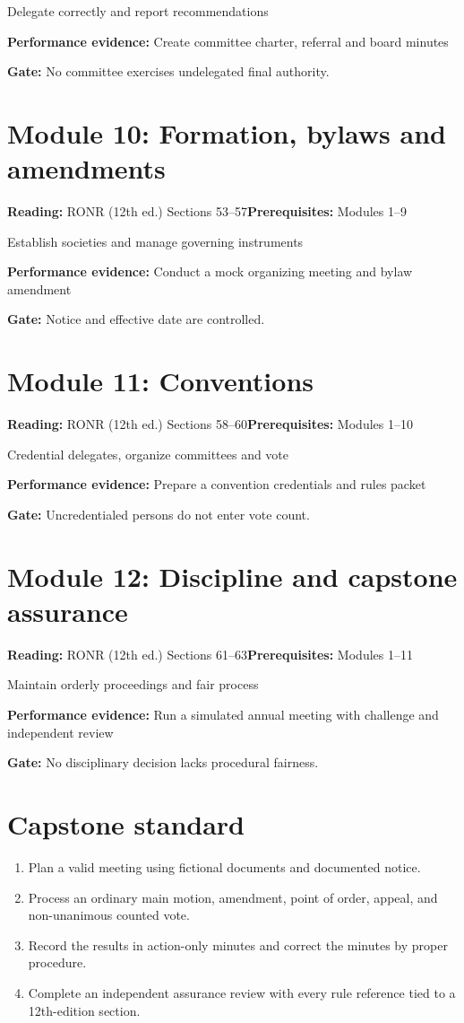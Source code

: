\documentclass[11pt]{article}
\begin{document}
Delegate correctly and report recommendations

\textbf{Performance evidence:} Create committee charter, referral and board minutes

\textbf{Gate:} No committee exercises undelegated final authority.

\section{Module 10: Formation, bylaws and amendments}
\textbf{Reading:} RONR (12th ed.) Sections 53--57\quad\textbf{Prerequisites:} Modules 1--9

Establish societies and manage governing instruments

\textbf{Performance evidence:} Conduct a mock organizing meeting and bylaw amendment

\textbf{Gate:} Notice and effective date are controlled.

\section{Module 11: Conventions}
\textbf{Reading:} RONR (12th ed.) Sections 58--60\quad\textbf{Prerequisites:} Modules 1--10

Credential delegates, organize committees and vote

\textbf{Performance evidence:} Prepare a convention credentials and rules packet

\textbf{Gate:} Uncredentialed persons do not enter vote count.

\section{Module 12: Discipline and capstone assurance}
\textbf{Reading:} RONR (12th ed.) Sections 61--63\quad\textbf{Prerequisites:} Modules 1--11

Maintain orderly proceedings and fair process

\textbf{Performance evidence:} Run a simulated annual meeting with challenge and independent review

\textbf{Gate:} No disciplinary decision lacks procedural fairness.

\section{Capstone standard}
\begin{enumerate}[leftmargin=*,itemsep=4pt]
\item Plan a valid meeting using fictional documents and documented notice.
\item Process an ordinary main motion, amendment, point of order, appeal, and non-unanimous counted vote.
\item Record the results in action-only minutes and correct the minutes by proper procedure.
\item Complete an independent assurance review with every rule reference tied to a 12th-edition section.
\end{enumerate}
\end{document}

